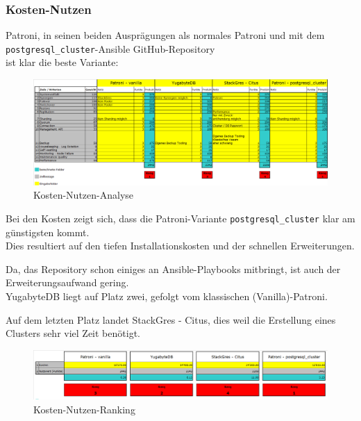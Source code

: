 
\clearpage
\begin{flushleft}
    \subsubsection{Kosten-Nutzen}
    Patroni, in seinen beiden Ausprägungen als normales Patroni und mit dem \texttt{postgresql\_cluster}-Ansible \Gls{GitHub}-Repository\\
    ist klar die beste Variante:
    \begin{figure}[H]
        \centering
        \includegraphics[width=1\linewidth]{source/implementation/evaluation/solution_comparison/nutzwert_analyse}
        \caption{Kosten-Nutzen-Analyse}
        \label{fig:nutzwert_analyse}
    \end{figure}
\end{flushleft}
\begin{flushleft}
    Bei den Kosten zeigt sich, dass die Patroni-Variante \texttt{postgresql\_cluster} klar am günstigsten kommt.\\
    Dies resultiert auf den tiefen Installationskosten und der schnellen Erweiterungen.
\end{flushleft}
\begin{flushleft}
    Da, das Repository schon einiges an Ansible-Playbooks mitbringt, ist auch der Erweiterungsaufwand gering.\\
    YugabyteDB liegt auf Platz zwei, gefolgt vom klassischen (Vanilla)-Patroni.
\end{flushleft}
\begin{flushleft}
    Auf dem letzten Platz landet StackGres - Citus, dies weil die Erstellung eines Clusters sehr viel Zeit benötigt.
    \begin{figure}[H]
        \centering
        \includegraphics[width=1\linewidth]{source/implementation/evaluation/solution_comparison/cost_benefit_ranking}
        \caption{Kosten-Nutzen-Ranking}
        \label{fig:cost_benefit_ranking}
    \end{figure}
\end{flushleft}
